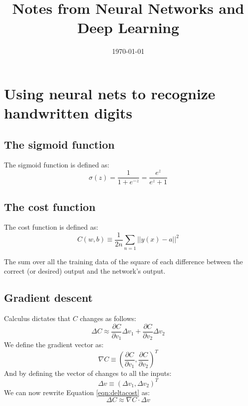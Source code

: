 \documentclass[11pt]{article}
\date{\today}
\title{Notes from Neural Networks and Deep Learning}
\begin{document}
\maketitle


\section{Using neural nets to recognize handwritten digits}
\label{sec:org75be78e}
\subsection{The sigmoid function}
\label{sec:orgcbcab66}
The sigmoid function is defined as:
\begin{equation} \label{eqn:sigmoid}
\sigma(z) = \frac{1}{1 + e^{-z}} = \frac{e^z}{e^z + 1}
\end{equation}

\subsection{The cost function}
\label{sec:org8ed9cda}
The cost function is defined as:
\begin{equation} \label{eqn:cost}
C(w,b) \equiv \frac{1}{2n} \sum_{n=1} ||y(x) - a||^2
\end{equation}

The sum over all the training data of the square of each difference between the correct (or desired) output
and the network's output.

\subsection{Gradient descent}
\label{sec:org85a25e0}
Calculus dictates that \(C\) changes as follows:
\begin{equation} \label{eqn:deltacost}
\Delta C \approx \frac{\partial C}{\partial v_1} \Delta v_1 + \frac{\partial C}{\partial v_2} \Delta v_2
\end{equation}
We define the gradient vector as:
\begin{equation}
\nabla C \equiv (\frac{\partial C}{\partial v_1}, \frac{\partial C}{\partial v_2})^T
\end{equation}
And by defining the vector of changes to all the inputs:
\begin{equation}
\Delta v \equiv (\Delta v_1, \Delta v_2)^T
\end{equation}
We can now rewrite Equation \ref{eqn:deltacost} as:
\begin{equation} \label{eqn:deltacostconcise}
\Delta C \approx \nabla C \cdot \Delta v
\end{equation}
\end{document}
